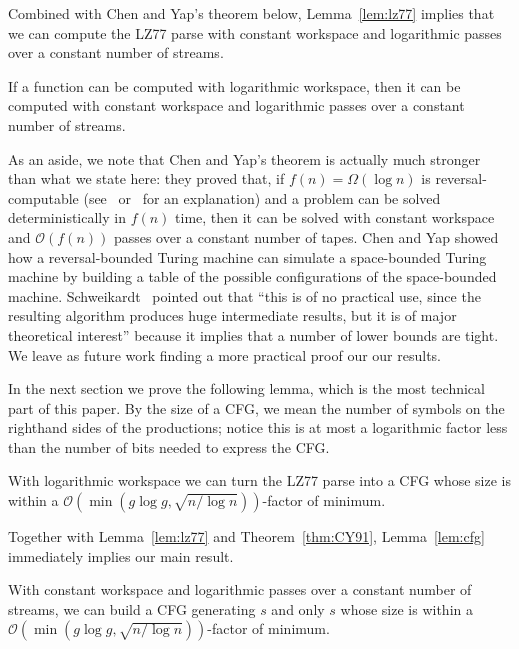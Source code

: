 \documentclass[runningheads]{llncs}
\newcommand{\Oh}[1]
    {\ensuremath{\mathcal{O}\!\left( {#1} \right)}}
\begin{document}
Combined with Chen and Yap's theorem below, Lemma~\ref{lem:lz77} implies that we can compute the LZ77 parse with constant workspace and logarithmic passes over a constant number of streams.

\begin{theorem} \label{thm:CY91}
If a function can be computed with logarithmic workspace, then it can be computed with constant workspace and logarithmic passes over a constant number of streams.
\end{theorem}

As an aside, we note that Chen and Yap's theorem is actually much stronger than what we state here: they proved that, if \(f (n) = \Omega (\log n)\) is reversal-computable (see~\cite{CY91} or~\cite{HS08} for an explanation) and a problem can be solved deterministically in \(f (n)\) time, then it can be solved with constant workspace and $\Oh{f (n)}$ passes over a constant number of tapes.  Chen and Yap showed how a reversal-bounded Turing machine can simulate a space-bounded Turing machine by building a table of the possible configurations of the space-bounded machine.  Schweikardt~\cite{Sch07} pointed out that ``this is of no practical use, since the resulting algorithm produces huge intermediate results, but it is of major theoretical interest'' because it implies that a number of lower bounds are tight.  We leave as future work finding a more practical proof our our results.

In the next section we prove the following lemma, which is the most technical part of this paper.  By the size of a CFG, we mean the number of symbols on the righthand sides of the productions; notice this is at most a logarithmic factor less than the number of bits needed to express the CFG.

\begin{lemma} \label{lem:cfg}
With logarithmic workspace we can turn the LZ77 parse into a CFG whose size is within a $\Oh{\min \left( g \log g, \sqrt{n / \log n} \right)}$-factor of minimum.
\end{lemma}

\noindent Together with Lemma~\ref{lem:lz77} and Theorem~\ref{thm:CY91}, Lemma~\ref{lem:cfg} immediately implies our main result.

\begin{theorem}
With constant workspace and logarithmic passes over a constant number of streams, we can build a CFG generating $s$ and only $s$ whose size is within a $\Oh{\min \left( g \log g, \sqrt{n / \log n} \right)}$-factor of minimum.
\end{theorem}
\end{document}
